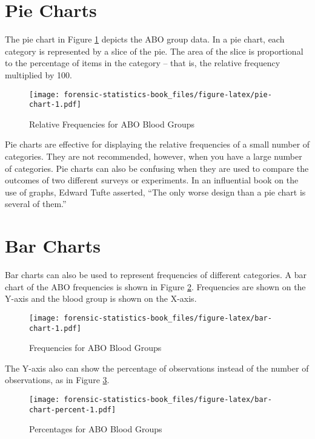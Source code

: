 \documentclass[
]{book}
\begin{document}
\hypertarget{pie-charts}{%
\section{Pie Charts}\label{pie-charts}}

The pie chart in Figure \ref{fig:pie-chart} depicts the ABO group data. In a pie chart,
each category is represented by a slice of the pie. The area of the slice is
proportional to the percentage of items in the category -- that is, the
relative frequency multiplied by 100.

\begin{figure}
\centering
\texttt{[image: forensic-statistics-book\_files/figure-latex/pie-chart-1.pdf]}
\caption{\label{fig:pie-chart}Relative Frequencies for ABO Blood Groups}
\end{figure}

Pie charts are effective for displaying the relative frequencies of a small
number of categories. They are not recommended, however, when you have a large
number of categories. Pie charts can also be confusing when they are used to
compare the outcomes of two different surveys or experiments. In an influential
book on the use of graphs, Edward Tufte asserted, ``The only worse design than
a pie chart is several of them.''

\hypertarget{bar-charts}{%
\section{Bar Charts}\label{bar-charts}}

Bar charts can also be used to represent frequencies of different categories.
A bar chart of the ABO frequencies is shown in Figure \ref{fig:bar-chart}. Frequencies are shown
on the Y-axis and the blood group is shown on the X-axis.

\begin{figure}
\centering
\texttt{[image: forensic-statistics-book\_files/figure-latex/bar-chart-1.pdf]}
\caption{\label{fig:bar-chart}Frequencies for ABO Blood Groups}
\end{figure}

The Y-axis also can show the percentage of observations
instead of the number of observations, as in Figure \ref{fig:bar-chart-percent}.

\begin{figure}
\centering
\texttt{[image: forensic-statistics-book\_files/figure-latex/bar-chart-percent-1.pdf]}
\caption{\label{fig:bar-chart-percent}Percentages for ABO Blood Groups}
\end{figure}
\end{document}
